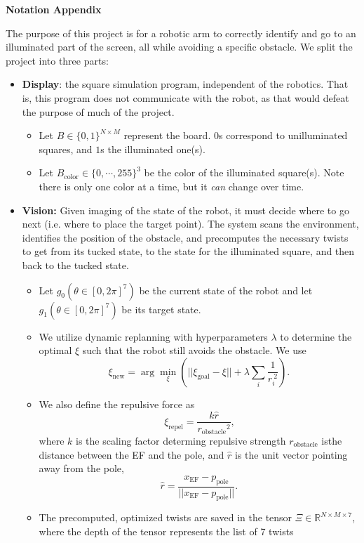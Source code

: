 \documentclass{article}
\newcommand{\p}{\text{.}}
\newcommand{\q}{\text{,}}
\begin{document}
\begin{center}
\textbf{Notation Appendix}
\end{center}
The purpose of this project is for a robotic arm to correctly identify and go to an illuminated part of the screen, all while avoiding a specific obstacle. We split the project into three parts:
\begin{itemize}
    \item \textbf{Display}: the square simulation program, independent of the robotics. That is, this program does not communicate with the robot, as that would defeat the purpose of much of the project.
    \begin{itemize}
        \item Let $B \in \{0, 1\}^{N \times M}$ represent the board. $0$s correspond to unilluminated squares, and $1$s the illuminated one(s).
        \item Let $B_\text{color} \in \{0, \cdots, 255\}^3$ be the color of the illuminated square(s). Note there is only one color at a time, but it \textit{can} change over time.
    \end{itemize}
    
    \item \textbf{Vision:} Given imaging of the state of the robot, it must decide where to go next (i.e. where to place the target point). The system scans the environment, identifies the position of the obstacle, and precomputes the necessary twists to get from its tucked state, to the state for the illuminated square, and then back to the tucked state. 
    \begin{itemize}
        \item Let $g_0(\theta \in [0, 2\pi]^7)$ be the current state of the robot and let $g_1(\theta \in [0, 2\pi]^7)$ be its target state.
        \item We utilize dynamic replanning with hyperparameters $\lambda$ to determine the optimal $\xi$ such that the robot still avoids the obstacle. We use
        $$\xi_\text{new} = \arg \min_\xi (||\xi_\text{goal} - \xi|| + \lambda \sum_i \frac{1}{r_i^{~2}}) \p$$
        \item We also define the repulsive force as 
        $$\xi_\text{repel} = \frac{k\hat{r}}{{r_\text{obstacle}}^2} \q$$
        where $k$ is the scaling factor determing repulsive strength $r_\text{obstacle}$ isthe distance between the EF and the pole, and $\hat{r}$ is the unit vector pointing away from the pole, 
        $$\hat{r} = \frac{x_\text{EF} - p_\text{pole}}{||x_\text{EF} - p_\text{pole}||} \p$$
        \item The precomputed, optimized twists are saved in the tensor $\Xi \in \mathbb{R}^{N \times M \times 7}$, where the depth of the tensor represents the list of 7 twists
    \end{itemize}
    

\end{itemize}
\end{document}
